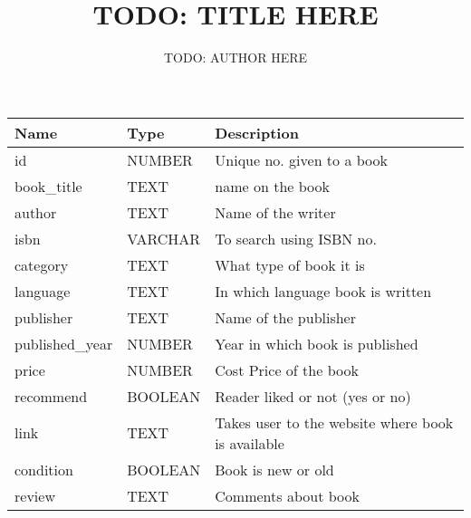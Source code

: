 \documentclass[10pt,a4paper]{article}
\title{TODO: TITLE HERE}
\author{TODO: AUTHOR HERE}
\begin{document}
\maketitle

\begin{tabularx}{\textwidth}{llX}
\toprule
\textbf{Name} & \textbf{Type} & \textbf{Description}\\
\midrule
id & NUMBER & Unique no. given to a book\\
book\_title & TEXT & name on the book\\
author & TEXT & Name of the writer\\
isbn & VARCHAR & To search using ISBN no.\\
category & TEXT & What type of book it is\\
language & TEXT & In which language book is written\\
publisher & TEXT & Name of the publisher\\
published\_year & NUMBER & Year in which book is published\\
price & NUMBER & Cost Price of the book\\
recommend & BOOLEAN & Reader liked or not (yes or no)\\
link & TEXT & Takes user to the website where book is available\\
condition & BOOLEAN & Book is new or old\\
review & TEXT & Comments about book\\
\bottomrule
\end{tabularx}
\end{document}
